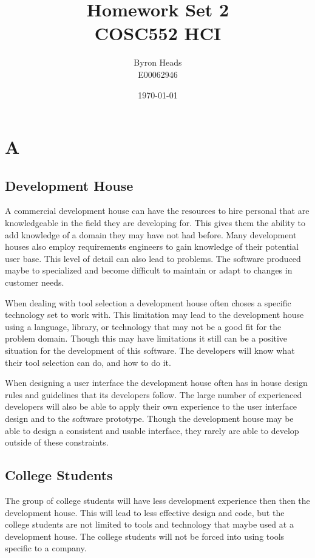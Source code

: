 \documentclass[12pt]{article}
\title{Homework Set 2 \\
    COSC552 HCI}
\author{ Byron Heads \\
    E00062946 }
\date{\today}
\begin{document}
\maketitle

\section*{A}

\subsection*{Development House}
A commercial development house can have the resources to hire personal
that are knowledgeable in the field they are developing for.  This gives
them the ability to add knowledge of a domain they may have not had
before.  Many development houses also employ requirements engineers to
gain knowledge of their potential user base.  This level of detail can
also lead to problems.  The software produced maybe to specialized and
become difficult to maintain or adapt to changes in customer needs.

When dealing with tool selection a development house often choses a 
specific technology set to work with.  This limitation may lead to the
development house using a language, library, or technology that may not
be a good fit for the problem domain.  Though this may have limitations
it still can be a positive situation for the development of this software.
The developers will know what their tool selection can do, and how to
do it.

When designing a user interface the development house often has in house
design rules and guidelines that its developers follow.  The large number
of experienced developers will also be able to apply their own experience 
to the user interface design and to the software prototype.  Though the 
development house may be able to design a consistent and usable interface,
they rarely are able to develop outside of these constraints.

\subsection*{College Students}

The group of college students will have less development experience then
then the development house.  This will lead to less effective design and
code, but the college students are not limited to tools and technology 
that maybe used at a development house.  The college students will not be 
forced into using tools specific to a company.
\end{document}
